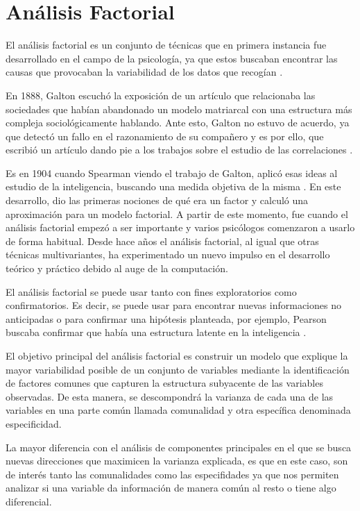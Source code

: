 \newpage
\section{Análisis Factorial}

\noindent El análisis factorial es un conjunto de técnicas que en primera instancia fue desarrollado en el campo de la psicología, ya que estos buscaban encontrar las causas que provocaban la variabilidad de los datos que recogían \cite{Vincent 1953}. 

\noindent En 1888, Galton escuchó la exposición de un artículo que relacionaba las sociedades que habían abandonado un modelo matriarcal con una estructura más compleja sociológicamente hablando. Ante esto, Galton no estuvo de acuerdo, ya que detectó un fallo en el razonamiento de su compañero y es por ello, que escribió un artículo  dando pie a los trabajos sobre el estudio de las correlaciones \cite{Galton 1889}.   

\noindent Es en 1904 cuando Spearman  viendo el trabajo de Galton, aplicó esas ideas al estudio de la inteligencia, buscando una medida objetiva de la misma \cite{Spearman 1904}. En este desarrollo, dio las primeras nociones de qué era un factor y calculó una aproximación para un modelo factorial. A partir de este momento, fue cuando el análisis factorial empezó a ser importante y varios psicólogos comenzaron a usarlo de forma habitual. 
Desde hace años el análisis factorial, al igual que otras técnicas multivariantes, ha experimentado un nuevo impulso en el desarrollo teórico y práctico debido al auge de la computación. 

\noindent El análisis factorial se puede usar tanto con fines exploratorios como confirmatorios. Es decir, se puede usar para encontrar nuevas informaciones no anticipadas o para confirmar una hipótesis planteada, por ejemplo, Pearson buscaba confirmar que había una estructura latente en la inteligencia \cite{Hair 1995}.

\noindent El objetivo principal del análisis factorial es construir un modelo que explique la mayor variabilidad posible de un conjunto de variables mediante la identificación de factores comunes que capturen la estructura subyacente de las variables observadas. De esta manera, se descompondrá la varianza de cada una de las variables en una parte común llamada comunalidad  y otra específica denominada especificidad. 

\noindent La mayor diferencia con el análisis de componentes principales en el que se busca nuevas direcciones que maximicen la varianza explicada, es que en este caso, son de interés tanto las comunalidades como las especifidades ya que nos permiten analizar si una variable da información de manera común al resto o tiene algo diferencial. 

